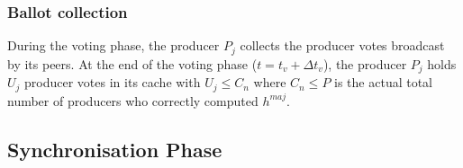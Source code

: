 \documentclass{article}
\begin{document}
\subsubsection{Ballot collection}
During the voting phase, the producer $P_j$ collects the producer votes broadcast by its peers. At the end of the voting phase ($t = t_v+\Delta t_{v}$), the producer $P_j$ holds $U_j$ producer votes in its cache with $U_j \leq C_n$ where $C_n \leq P$ is the actual total number of producers who correctly computed $h^{maj}$.

\subsection{Synchronisation Phase}



\end{document}
